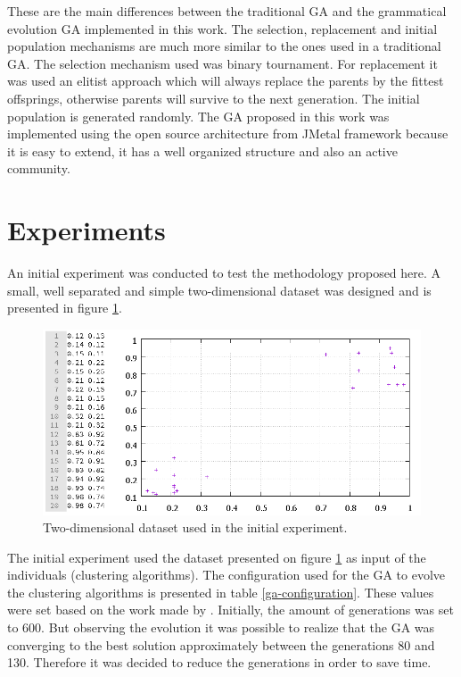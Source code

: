 \documentclass[journal]{IEEEtran}
\begin{document}
These are the main differences between the traditional GA and the grammatical evolution GA  implemented in this work. The selection, replacement and initial population mechanisms are much more similar to the ones used in a traditional GA. The selection mechanism used was binary tournament. For replacement it was used an elitist approach which will always replace the parents by the fittest offsprings, otherwise parents will survive to the next generation. The initial population is generated randomly. 
The GA proposed in this work was implemented using the open source architecture from JMetal framework \cite{jMetal} because it is easy to extend, it has a well organized structure and also an active community.  


\section{Experiments}
An initial experiment was conducted to test the methodology proposed here. A small, well separated and simple two-dimensional dataset was designed and is presented in figure \ref{fig:simpleDataset}.

\begin{figure}[ht]
	\centering
	\includegraphics[scale=.9]{figures/simpleDataset.png}
	\caption{Two-dimensional dataset used in the initial experiment.}
	\label{fig:simpleDataset}
\end{figure}


The initial experiment used the dataset presented on figure \ref{fig:simpleDataset} as input of the individuals (clustering algorithms). The configuration used for the GA to evolve the clustering algorithms is presented in table \ref{ga-configuration}. These values were set based on the work made by \cite{lourencco2012evolving}. Initially, the amount of generations was set to 600. But observing the evolution it was possible to realize that the GA was converging to the best solution approximately between the generations 80 and 130. Therefore it was decided to reduce the generations in order to save time.
\end{document}
